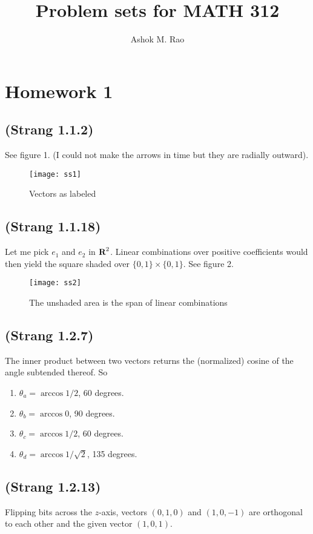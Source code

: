 \documentclass[10pt]{article}
\title{Problem sets for MATH 312}
\author{Ashok M. Rao}
\newcommand{\reals}{{\mbox{\bf R}}}
\begin{document}
\maketitle

\section{Homework 1}
\subsection{(Strang 1.1.2)}
See figure 1. (I could not make the arrows in time but they are radially outward). 
\begin{figure}
\begin{center}
\texttt{[image: ss1]}
\end{center}
\caption{Vectors as labeled}
\end{figure}

\subsection{(Strang 1.1.18)}
Let me pick $e_1$ and $e_2$ in $\reals^2$. Linear combinations over positive coefficients would then yield the square shaded over $\{0, 1\}\times\{0, 1\}$. See figure 2.
\begin{figure}
\begin{center}
\texttt{[image: ss2]}
\end{center}
\caption{The unshaded area is the span of linear combinations}
\end{figure}

\subsection{(Strang 1.2.7)}
The inner product between two vectors returns the (normalized) cosine of the angle subtended thereof.  So
\begin{enumerate}
	\item $\theta_a = \arccos{1/2}$, 60 degrees.
	\item $\theta_b = \arccos{0}$, 90 degrees.
	\item $\theta_c = \arccos{1/2}$, 60 degrees.
	\item $\theta_d = \arccos{1/\sqrt{2}}$, 135 degrees. 
\end{enumerate}

\subsection{(Strang 1.2.13)}
Flipping bits across the $z$-axis, vectors $(0, 1, 0)$ and $(1, 0, -1)$ are orthogonal to each other and the given vector $(1, 0, 1)$.
\end{document}
